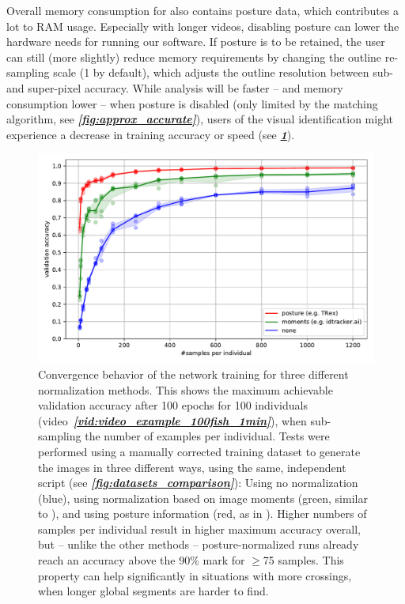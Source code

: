 \documentclass[9pt,lineno]{elife}
\newcommand{\figref}[1]{\textit{\textbf{\ref{#1}}}}
\newcommand{\videoref}[1]{video~\textit{\textbf{\ref{#1}}}}
\newcommand{\idtracker}{\protect\path{ idtracker.ai}}
\newcommand{\TRex}{\protect\path{TRex}}
\begin{document}
Overall memory consumption for \TRex{} also contains posture data, which contributes a lot to RAM usage. Especially with longer videos, disabling posture can lower the hardware needs for running our software. If posture is to be retained, the user can still (more slightly) reduce memory requirements by changing the outline re-sampling scale (1 by default), which adjusts the outline resolution between sub- and super-pixel accuracy. While analysis will be faster -- and memory consumption lower -- when posture is disabled (only limited by the matching algorithm, see \figref{fig:approx_accurate}), users of the visual identification might experience a decrease in training accuracy or speed (see \figref{fig:maximum_val_acc_per_samples}).

\begin{figure}[h]
\includegraphics[width=0.9\linewidth]{raw_posture_moments.pdf}
\caption{Convergence behavior of the network training for three different normalization methods. This shows the maximum achievable validation accuracy after 100 epochs for 100 individuals (\videoref{vid:video_example_100fish_1min}), when sub-sampling the number of examples per individual. Tests were performed using a manually corrected training dataset to generate the images in three different ways, using the same, independent script (see \figref{fig:datasets_comparison}): Using no normalization (blue), using normalization based on image moments (green, similar to \idtracker{}), and using posture information (red, as in \TRex{}). Higher numbers of samples per individual result in higher maximum accuracy overall, but -- unlike the other methods -- posture-normalized runs already reach an accuracy above the 90\% mark for $\geq$75 samples. This property can help significantly in situations with more crossings, when longer global segments are harder to find.}
\label{fig:maximum_val_acc_per_samples}
\end{figure}
\end{document}
